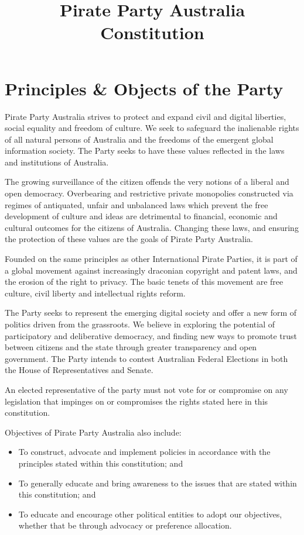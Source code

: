 \documentclass[a4paper,titlepage,8.5pt]{article}
\title{Pirate Party Australia Constitution}
\begin{document}
\tableofcontents
\thispagestyle{empty}
\newpage

\setcounter{page}{1}

\part{Principles \& Objects of the Party}
Pirate Party Australia strives to protect and expand civil and digital liberties, social equality and freedom of culture. We seek to safeguard the inalienable rights of all natural persons of Australia and the freedoms of the emergent global information society. The Party seeks to have these values reflected in the laws and institutions of Australia.

The growing surveillance of the citizen offends the very notions of a liberal and open democracy. Overbearing and restrictive private monopolies constructed via regimes of antiquated, unfair and unbalanced laws which prevent the free development of culture and ideas are detrimental to financial, economic and cultural outcomes for the citizens of Australia. Changing these laws, and ensuring the protection of these values are the goals of Pirate Party Australia. 

Founded on the same principles as other International Pirate Parties, it is part of a global movement against increasingly draconian copyright and patent laws, and the erosion of the right to privacy. The basic tenets of this movement are free culture, civil liberty and intellectual rights reform.

The Party seeks to represent the emerging digital society and offer a new form of politics driven from the grassroots. We believe in exploring the potential of participatory and deliberative democracy, and finding new ways to promote trust between citizens and the state through greater transparency and open government. The Party intends to contest Australian Federal Elections in both the House of Representatives and Senate.

An elected representative of the party must not vote for or compromise on any legislation that impinges on or compromises the rights stated here in this constitution.


Objectives of Pirate Party Australia also include:
\begin{itemize}
\item To construct, advocate and implement policies in accordance with the principles stated within this constitution; and
\item To generally educate and bring awareness to the issues that are stated within this constitution; and
\item To educate and encourage other political entities to adopt our objectives, whether that be through advocacy or preference allocation.
\end{itemize}
\end{document}
